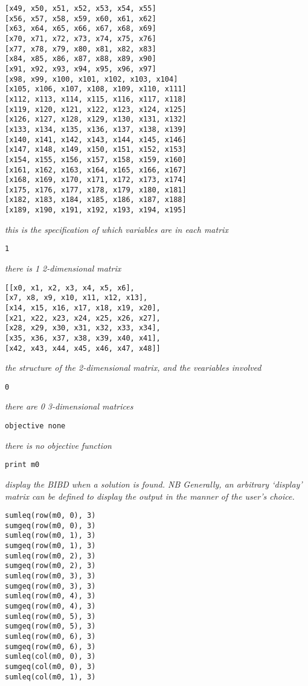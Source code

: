 \documentclass{article}
\begin{document}
\begin{small}
\begin{verbatim}
[x49, x50, x51, x52, x53, x54, x55]
[x56, x57, x58, x59, x60, x61, x62]
[x63, x64, x65, x66, x67, x68, x69]
[x70, x71, x72, x73, x74, x75, x76]
[x77, x78, x79, x80, x81, x82, x83]
[x84, x85, x86, x87, x88, x89, x90]
[x91, x92, x93, x94, x95, x96, x97]
[x98, x99, x100, x101, x102, x103, x104]
[x105, x106, x107, x108, x109, x110, x111]
[x112, x113, x114, x115, x116, x117, x118]
[x119, x120, x121, x122, x123, x124, x125]
[x126, x127, x128, x129, x130, x131, x132]
[x133, x134, x135, x136, x137, x138, x139]
[x140, x141, x142, x143, x144, x145, x146]
[x147, x148, x149, x150, x151, x152, x153]
[x154, x155, x156, x157, x158, x159, x160]
[x161, x162, x163, x164, x165, x166, x167]
[x168, x169, x170, x171, x172, x173, x174]
[x175, x176, x177, x178, x179, x180, x181]
[x182, x183, x184, x185, x186, x187, x188]
[x189, x190, x191, x192, x193, x194, x195]
\end{verbatim}
\emph{this is the specification of which variables are in each matrix}
\begin{verbatim}
1
\end{verbatim}
\emph{there is 1 2-dimensional matrix}
\begin{verbatim}
[[x0, x1, x2, x3, x4, x5, x6],
[x7, x8, x9, x10, x11, x12, x13],
[x14, x15, x16, x17, x18, x19, x20],
[x21, x22, x23, x24, x25, x26, x27],
[x28, x29, x30, x31, x32, x33, x34],
[x35, x36, x37, x38, x39, x40, x41],
[x42, x43, x44, x45, x46, x47, x48]]
\end{verbatim}
\emph{the structure of the 2-dimensional matrix, and the veariables involved}
\begin{verbatim}
0
\end{verbatim}
\emph{there are 0 3-dimensional matrices}
\begin{verbatim}
objective none
\end{verbatim}
\emph{there is no objective function}
\begin{verbatim}
print m0
\end{verbatim}
\emph{display the BIBD when a solution is found. NB Generally, an arbitrary
`display' matrix can be defined to display the output in the manner of the
user's choice.}
\begin{verbatim}
sumleq(row(m0, 0), 3)
sumgeq(row(m0, 0), 3)
sumleq(row(m0, 1), 3)
sumgeq(row(m0, 1), 3)
sumleq(row(m0, 2), 3)
sumgeq(row(m0, 2), 3)
sumleq(row(m0, 3), 3)
sumgeq(row(m0, 3), 3)
sumleq(row(m0, 4), 3)
sumgeq(row(m0, 4), 3)
sumleq(row(m0, 5), 3)
sumgeq(row(m0, 5), 3)
sumleq(row(m0, 6), 3)
sumgeq(row(m0, 6), 3)
sumleq(col(m0, 0), 3)
sumgeq(col(m0, 0), 3)
sumleq(col(m0, 1), 3)

\end{verbatim}
\end{small}
\end{document}
